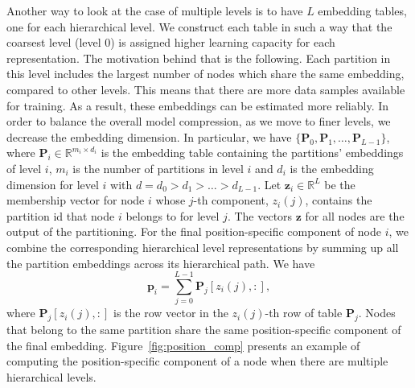 \documentclass[conference]{IEEEtran}
\begin{document}
Another way to look at the case of multiple levels is to have $L$ embedding tables, one for each hierarchical level. 
We construct each table in such a way that the coarsest level (level $0$) is assigned higher learning capacity for each representation. The motivation behind that is the following. Each partition in this level includes the largest number of nodes which share the same embedding, compared to other levels. This means that there are more data samples available for training. As a result, these embeddings can be estimated more reliably. 
In order to balance the overall model compression, as we move to finer levels, we decrease the embedding dimension.
% 
In particular, we have $\{\mathbf{P}_0, \mathbf{P}_1, \dots, \mathbf{P}_{L-1}\}$, where $\mathbf{P}_i \in \mathbb{R}^{m_i \times d_i}$ is the embedding table containing the partitions' embeddings of level $i$, 
$m_i$ is the number of partitions in level $i$ and $d_i$ is the embedding dimension for level $i$ with $d = d_0 > d_1 > \dots > d_{L-1}$. 
% 
Let $\mathbf{z}_i \in \mathbb{R}^L$ be the membership vector for node $i$ whose $j$-th component, $z_i(j)$, contains the partition id that node $i$ belongs to for level $j$. The vectors $\mathbf{z}$ for all nodes are the output of the partitioning. 
% 
For the final position-specific component of node $i$, we combine the corresponding hierarchical level representations by summing up all the partition embeddings across its hierarchical path. 
We have
%
\begin{equation}
\label{pi}
    \mathbf{p}_i = \sum_{j=0}^{L-1} \mathbf{P}_j[z_i(j), :],
\end{equation}
% 
where $\mathbf{P}_j[z_i(j), :]$ is the row vector in the $z_i(j)$-th row of table $\mathbf{P}_j$.
% 
Nodes that belong to the same partition share the same position-specific component of the final embedding. Figure~\ref{fig:position_comp} presents an example of computing the position-specific component of a node when there are multiple hierarchical levels.



\end{document}
